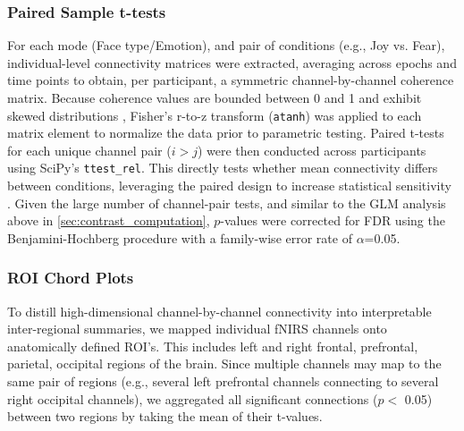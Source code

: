 \subsubsection{Paired Sample t-tests}
For each mode (Face type/Emotion), and pair of conditions (e.g., Joy vs. Fear), individual-level connectivity matrices were extracted, averaging across epochs and time points to obtain, per participant, a symmetric channel-by-channel coherence matrix. 
Because coherence values are bounded between 0 and 1 and exhibit skewed distributions \citep{miranda_de_sa_coherence_2009}, Fisher's r-to-z transform (\texttt{atanh}) was applied to each matrix element to normalize the data prior to parametric testing. 
Paired t-tests for each unique channel pair ($i > j$) were then conducted across participants using SciPy's \texttt{ttest\_rel}.
This directly tests whether mean connectivity differs between conditions, leveraging the paired design to increase statistical sensitivity \citep{hu_characterizing_2023}. 
Given the large number of channel-pair tests, and similar to the GLM analysis above in \ref{sec:contrast_computation}, $p$-values were corrected for FDR using the Benjamini-Hochberg procedure \citep{singh_exploring_2006} with a family-wise error rate of $\alpha$=0.05.

\subsubsection{ROI Chord Plots}
To distill high-dimensional channel-by-channel connectivity into interpretable inter-regional summaries, we mapped individual fNIRS channels onto anatomically defined ROI's. 
This includes left and right frontal, prefrontal, parietal, occipital regions of the brain. 
Since multiple channels may map to the same pair of regions (e.g., several left prefrontal channels connecting to several right occipital channels), we aggregated all significant connections ($p <$ 0.05) between two regions by taking the mean of their t-values. 

